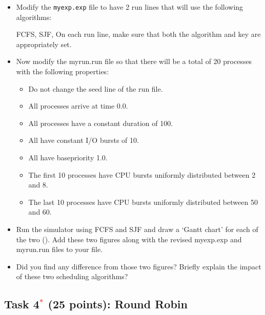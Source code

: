 \documentclass[16pt]{article}
\begin{document}
\begin{itemize}
\item Modify the \texttt{myexp.exp} file to have 2 run lines that will use the following
algorithms:

FCFS, SJF, On each run line, make sure that both the algorithm and key are
appropriately set.
\item Now modify the myrun.run file so that there will be a total of 20 processes with
the following properties:

\begin{itemize}
\item Do not change the seed line of the run file.
\item All processes arrive at time 0.0.
\item All processes have a constant duration of 100.
\item All have constant I/O bursts of 10.
\item All have basepriority 1.0.
\item The first 10 processes have CPU bursts uniformly distributed between 2
and 8.
\item The last 10 processes have CPU bursts uniformly distributed between 50
and 60.
\end{itemize}
\item Run the simulator using FCFS and SJF and draw a `Gantt chart' for each of the two ().
Add these two figures along with the revised myexp.exp and myrun.run files to your file.
\item Did you find any difference from those two figures? Briefly explain the impact of
these two scheduling algorithms?

\end{itemize}

\subsection*{Task 4\textcolor{red}{$^{*}$} (25 points): Round Robin}
\end{document}
